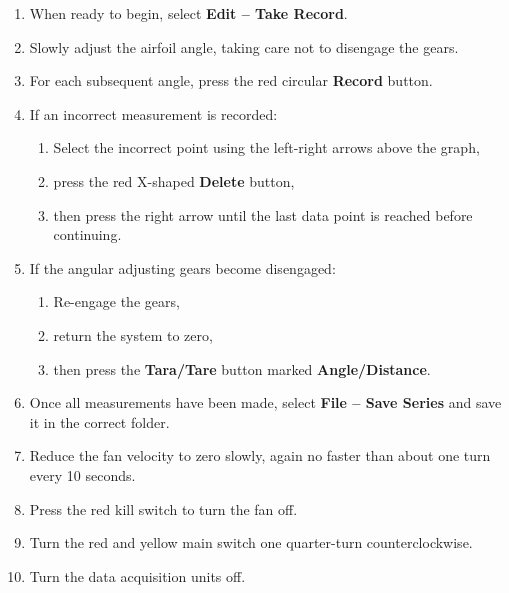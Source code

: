 \documentclass[12pt,letterpaper]{article}
\begin{document}
\begin{enumerate}[leftmargin=*, label=\arabic*.]
\begin{enumerate}[label=\alph*.]
\begin{itemize}
        \end{itemize}
        \item Adjust the X-axis range:
        \begin{itemize}
            \item \textbf{a Angle}: \(-5\) to \(95^\circ\)
        \end{itemize}
        \item Select \textbf{File -- New Series}.
        \item Name the series using your lab group number and the date.
    \end{enumerate}
    \item When ready to begin, select \textbf{Edit -- Take Record}.
    \item Slowly adjust the airfoil angle, taking care not to disengage the gears.
    \item For each subsequent angle, press the red circular \textbf{Record} button.
    \item If an incorrect measurement is recorded:
    \begin{enumerate}[label=\alph*.]
        \item Select the incorrect point using the left-right arrows above the graph,
        \item press the red X-shaped \textbf{Delete} button,
        \item then press the right arrow until the last data point is reached before continuing.
    \end{enumerate}
    \item If the angular adjusting gears become disengaged:
    \begin{enumerate}[label=\alph*.]
        \item Re-engage the gears,
        \item return the system to zero,
        \item then press the \textbf{Tara/Tare} button marked \textbf{Angle/Distance}.
    \end{enumerate}
    \item Once all measurements have been made, select \textbf{File -- Save Series} and save it in the correct folder.
    \item Reduce the fan velocity to zero slowly, again no faster than about one turn every 10 seconds.
    \item Press the red kill switch to turn the fan off.
    \item Turn the red and yellow main switch one quarter-turn counterclockwise.
    \item Turn the data acquisition units off.
\end{enumerate}
\end{document}
